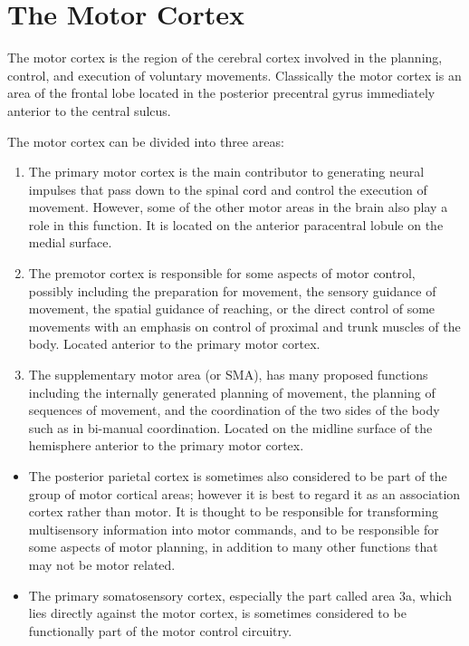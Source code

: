 \hypertarget{the-motor-cortex}{%
\section{The Motor Cortex}\label{the-motor-cortex}}

The motor cortex is the region of the cerebral cortex involved in the planning, control, and execution of voluntary movements. Classically the motor cortex is an area of the frontal lobe located in the posterior precentral gyrus immediately anterior to the central sulcus.

The motor cortex can be divided into three areas:

\begin{enumerate}
\def\labelenumi{\arabic{enumi}.}
\tightlist
\item
  The primary motor cortex is the main contributor to generating neural impulses that pass down to the spinal cord and control the execution of movement. However, some of the other motor areas in the brain also play a role in this function. It is located on the anterior paracentral lobule on the medial surface.
\item
  The premotor cortex is responsible for some aspects of motor control, possibly including the preparation for movement, the sensory guidance of movement, the spatial guidance of reaching, or the direct control of some movements with an emphasis on control of proximal and trunk muscles of the body. Located anterior to the primary motor cortex.
\item
  The supplementary motor area (or SMA), has many proposed functions including the internally generated planning of movement, the planning of sequences of movement, and the coordination of the two sides of the body such as in bi-manual coordination. Located on the midline surface of the hemisphere anterior to the primary motor cortex.
\end{enumerate}

\begin{itemize}
\tightlist
\item
  The posterior parietal cortex is sometimes also considered to be part of the group of motor cortical areas; however it is best to regard it as an association cortex rather than motor. It is thought to be responsible for transforming multisensory information into motor commands, and to be responsible for some aspects of motor planning, in addition to many other functions that may not be motor related.
\item
  The primary somatosensory cortex, especially the part called area 3a, which lies directly against the motor cortex, is sometimes considered to be functionally part of the motor control circuitry.
\end{itemize}

